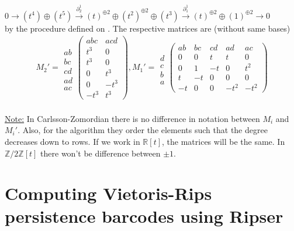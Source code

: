 \documentclass[11pt,a4paper]{report}
\begin{document}
              $0 \rightarrow (t^4)\oplus(t^5) \xrightarrow{\partial_2^1} (t)^{\oplus2}\oplus(t^2)^{\oplus2}\oplus(t^3) \xrightarrow{\partial_1^1} (t)^{\oplus2}\oplus(1)^{\oplus2} \rightarrow 0$\\
              by the procedure defined on \cite{Zomorodian_Carlsson_2005}. The respective matrices are (without same bases)
              \begin{align*}
                M_2' = \begin{array}{c}\\ab\\bc\\cd\\ad\\ac\end{array}\left(\begin{array}{cc}abc&acd\\t^3&0\\t^3&0\\0&t^3\\0&-t^3\\-t^3&t^3\end{array}\right), M_1' = \begin{array}{c}\\d\\c\\b\\a\end{array}\left(\begin{array}{ccccc}ab&bc&cd&ad&ac\\0&0&t&t&0\\0&1&-t&0&t^2\\t&-t&0&0&0\\-t&0&0&-t^2&-t^2\end{array}\right)
              \end{align*}
              \\
              \underline{Note:} In Carlsson-Zomordian there is no difference in notation between $M_i$ and $M_i'$. Also, for the algorithm they order the elements such that the degree decreases down to rows. If we work in $\mathbb{R}[t]$, the matrices will be the same. In $\mathbb{Z}/2\mathbb{Z}[t]$ there won't be difference between $\pm 1$.\\
              
            \section{Computing Vietoris-Rips persistence barcodes using Ripser}
\end{document}
